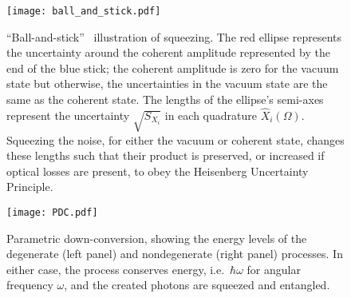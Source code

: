 \begin{figure}
	\centering
	\texttt{[image: ball\_and\_stick.pdf]}
	\caption{ ``Ball-and-stick''~\cite{} illustration of squeezing. The red ellipse represents the uncertainty around the coherent amplitude represented by the end of the blue stick; the coherent amplitude is zero for the vacuum state but otherwise, the uncertainties in the vacuum state are the same as the coherent state. The lengths of the ellipse's semi-axes represent the uncertainty $\sqrt{S_{X_i}}$ in each quadrature $\hat X_i(\Omega)$. Squeezing the noise, for either the vacuum or coherent state, changes these lengths such that their product is preserved, or increased if optical losses are present, to obey the Heisenberg Uncertainty Principle.}
	\label{fig:ballandstick_simple}
\end{figure}
\begin{figure}[ht]
	\centering
	\texttt{[image: PDC.pdf]}
	\caption{Parametric down-conversion, showing the energy levels of the degenerate (left panel) and nondegenerate (right panel) processes. In either case, the process conserves energy, i.e.\ $\hbar\omega$ for angular frequency $\omega$, and the created photons are squeezed and entangled.}
	\label{fig:PDC_deg_and_nondeg}
\end{figure}

